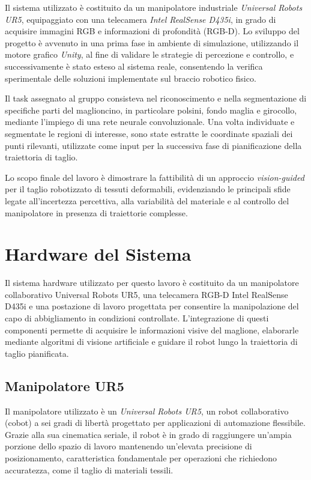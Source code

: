\documentclass[11pt]{report}
\begin{document}
Il sistema utilizzato è costituito da un manipolatore industriale \emph{Universal Robots UR5}, equipaggiato con una telecamera \emph{Intel RealSense D435i}, in grado di acquisire immagini RGB e informazioni di profondità (RGB-D). Lo sviluppo del progetto è avvenuto in una prima fase in ambiente di simulazione, utilizzando il motore grafico \emph{Unity}, al fine di validare le strategie di percezione e controllo, e successivamente è stato esteso al sistema reale, consentendo la verifica sperimentale delle soluzioni implementate sul braccio robotico fisico.

Il task assegnato al gruppo consisteva nel riconoscimento e nella segmentazione di specifiche parti del maglioncino, in particolare polsini, fondo maglia e girocollo, mediante l’impiego di una rete neurale convoluzionale. Una volta individuate e segmentate le regioni di interesse, sono state estratte le coordinate spaziali dei punti rilevanti, utilizzate come input per la successiva fase di pianificazione della traiettoria di taglio.

Lo scopo finale del lavoro è dimostrare la fattibilità di un approccio \emph{vision-guided} per il taglio robotizzato di tessuti deformabili, evidenziando le principali sfide legate all’incertezza percettiva, alla variabilità del materiale e al controllo del manipolatore in presenza di traiettorie complesse.

\chapter{Hardware del Sistema}

Il sistema hardware utilizzato per questo lavoro è costituito da un manipolatore collaborativo Universal Robots UR5, una telecamera RGB-D Intel RealSense D435i e una postazione di lavoro progettata per consentire la manipolazione del capo di abbigliamento in condizioni controllate. L'integrazione di questi componenti permette di acquisire le informazioni visive del maglione, elaborarle mediante algoritmi di visione artificiale e guidare il robot lungo la traiettoria di taglio pianificata.

\section{Manipolatore UR5}

Il manipolatore utilizzato è un \textit{Universal Robots UR5}, un robot collaborativo (cobot) a sei gradi di libertà progettato per applicazioni di automazione flessibile. Grazie alla sua cinematica seriale, il robot è in grado di raggiungere un'ampia porzione dello spazio di lavoro mantenendo un'elevata precisione di posizionamento, caratteristica fondamentale per operazioni che richiedono accuratezza, come il taglio di materiali tessili.
\end{document}
